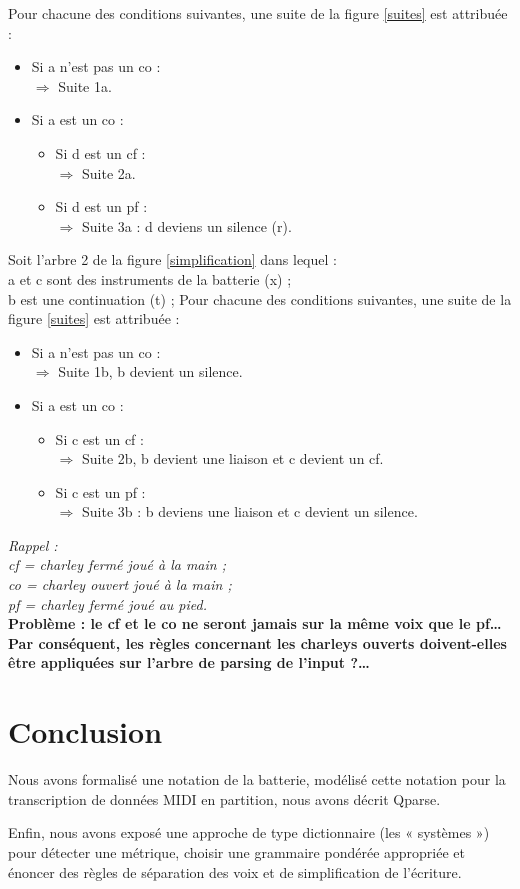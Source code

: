 Pour chacune des conditions suivantes, une suite de la figure \ref{suites} est attribuée :
\begin{itemize}
	\item Si a n’est pas un co :\\
	$\Rightarrow$ Suite 1a.
	\item Si a est un co :
	\begin{itemize}
		\item Si d est un cf :\\
		$\Rightarrow$ Suite 2a.
		\item Si d est un pf :\\
		$\Rightarrow$ Suite 3a : d deviens un silence (r).\\
	\end{itemize}
\end{itemize}
Soit l’arbre 2 de la figure \ref{simplification} dans lequel :\\
a et c sont des instruments de la batterie (x) ;\\
b est une continuation (t) ;
Pour chacune des conditions suivantes, une suite de la figure \ref{suites} est attribuée :
\begin{itemize}
	\item Si a n’est pas un co :\\
	$\Rightarrow$ Suite 1b, b devient un silence.
	\item Si a est un co :
	\begin{itemize}
		\item Si c est un cf :\\
		$\Rightarrow$ Suite 2b, b devient une liaison et c devient un cf.
		\item Si c est un pf :\\
		$\Rightarrow$ Suite 3b : b deviens une liaison et c devient un silence.\\
	\end{itemize}
\end{itemize}
\textit{Rappel :\\cf = charley fermé joué à la main ;\\co = charley ouvert joué à la main ;\\ pf = charley fermé joué au pied.}\\

\textbf{Problème : le cf et le co ne seront jamais sur la même voix que le pf… 
Par conséquent, les règles concernant les charleys ouverts doivent-elles être appliquées sur l’arbre de parsing de l’input ?…}

\section*{Conclusion}
Nous avons formalisé une notation de la batterie, modélisé cette notation pour la transcription de données MIDI en partition, nous avons décrit Qparse.

Enfin, nous avons exposé une approche de type dictionnaire (les « systèmes ») pour détecter une métrique, choisir une grammaire pondérée appropriée et énoncer des règles de séparation des voix et de simplification de l’écriture.
